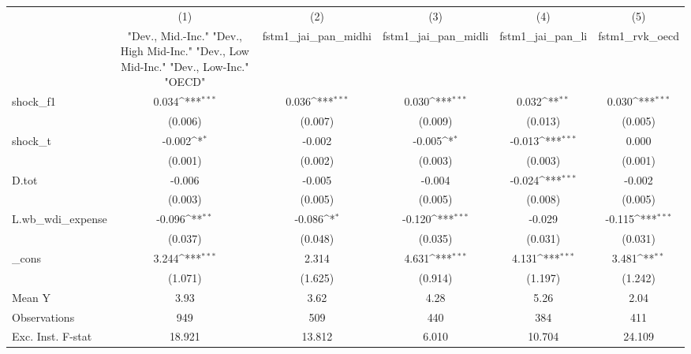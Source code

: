 {
\def\sym#1{\ifmmode^{#1}\else\(^{#1}\)\fi}
\begin{tabular}{l*{5}{c}}
\toprule
            &\multicolumn{1}{c}{(1)}&\multicolumn{1}{c}{(2)}&\multicolumn{1}{c}{(3)}&\multicolumn{1}{c}{(4)}&\multicolumn{1}{c}{(5)}\\
            &\multicolumn{1}{c}{ "Dev., Mid.-Inc." "Dev., High Mid-Inc." "Dev., Low Mid-Inc." "Dev., Low-Inc." "OECD" }&\multicolumn{1}{c}{fstm1\_jai\_pan\_midhi}&\multicolumn{1}{c}{fstm1\_jai\_pan\_midli}&\multicolumn{1}{c}{fstm1\_jai\_pan\_li}&\multicolumn{1}{c}{fstm1\_rvk\_oecd}\\
\midrule
shock\_f1    &       0.034\sym{***}&       0.036\sym{***}&       0.030\sym{***}&       0.032\sym{**} &       0.030\sym{***}\\
            &     (0.006)         &     (0.007)         &     (0.009)         &     (0.013)         &     (0.005)         \\
\addlinespace
shock\_t     &      -0.002\sym{*}  &      -0.002         &      -0.005\sym{*}  &      -0.013\sym{***}&       0.000         \\
            &     (0.001)         &     (0.002)         &     (0.003)         &     (0.003)         &     (0.001)         \\
\addlinespace
D.tot       &      -0.006         &      -0.005         &      -0.004         &      -0.024\sym{***}&      -0.002         \\
            &     (0.003)         &     (0.005)         &     (0.005)         &     (0.008)         &     (0.005)         \\
\addlinespace
L.wb\_wdi\_expense&      -0.096\sym{**} &      -0.086\sym{*}  &      -0.120\sym{***}&      -0.029         &      -0.115\sym{***}\\
            &     (0.037)         &     (0.048)         &     (0.035)         &     (0.031)         &     (0.031)         \\
\addlinespace
\_cons      &       3.244\sym{***}&       2.314         &       4.631\sym{***}&       4.131\sym{***}&       3.481\sym{**} \\
            &     (1.071)         &     (1.625)         &     (0.914)         &     (1.197)         &     (1.242)         \\
\midrule
Mean Y      &        3.93         &        3.62         &        4.28         &        5.26         &        2.04         \\
Observations&         949         &         509         &         440         &         384         &         411         \\
Exc. Inst. F-stat&      18.921         &      13.812         &       6.010         &      10.704         &      24.109         \\
\bottomrule
\end{tabular}
}
